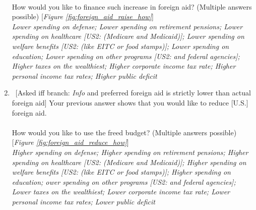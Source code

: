 \begin{enumerate}[resume]
\\
  How would you like to finance such increase in foreign aid? (Multiple answers possible) [\textit{Figure \ref{fig:foreign_aid_raise_how}}]
  \\ \textit{Lower spending on defense; Lower spending on retirement pensions; Lower spending on healthcare [US2: (Medicare and Medicaid)]; Lower spending on welfare benefits [US2: (like EITC or food stamps)]; Lower spending on education; Lower spending on other programs [US2: and federal agencies]; Higher taxes on the wealthiest; Higher corporate income tax rate; Higher personal income tax rates; Higher public deficit}
  \item \label{q:foreign_aid_reduce_how} ~[Asked iff branch: \textit{Info} and preferred foreign aid is strictly lower than actual foreign aid] Your previous answer shows that you would like to reduce [U.S.] foreign aid.\\
\\
  How would you like to use the freed budget? (Multiple answers possible) [\textit{Figure \ref{fig:foreign_aid_reduce_how}}]
  \\ \textit{Higher spending on defense; Higher spending on retirement pensions; Higher spending on healthcare [US2: (Medicare and Medicaid)]; Higher spending on welfare benefits [US2: (like EITC or food stamps)]; Higher spending on education; ower spending on other programs [US2: and federal agencies]; Lower taxes on the wealthiest; Lower corporate income tax rate; Lower personal income tax rates; Lower public deficit}
\end{enumerate}

